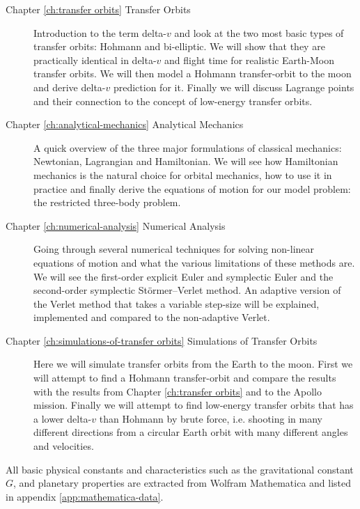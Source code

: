\begin{description}
    \item[Chapter \ref{ch:transfer orbits} Transfer Orbits] Introduction to the term delta-$v$ and look at the two most basic types of transfer orbits: Hohmann and bi-elliptic. We will show that they are practically identical in delta-$v$ and flight time for realistic Earth-Moon transfer orbits. We will then model a Hohmann transfer-orbit to the moon and derive delta-$v$ prediction for it. Finally we will discuss Lagrange points and their connection to the concept of low-energy transfer orbits.
    \item[Chapter \ref{ch:analytical-mechanics} Analytical Mechanics] A quick overview of the three major formulations of classical mechanics: Newtonian, Lagrangian and Hamiltonian. We will see how Hamiltonian mechanics is the natural choice for orbital mechanics, how to use it in practice and finally derive the equations of motion for our model problem: the restricted three-body problem.
    \item[Chapter \ref{ch:numerical-analysis} Numerical Analysis] Going through several numerical techniques for solving non-linear equations of motion and what the various limitations of these methods are. We will see the first-order explicit Euler and symplectic Euler and the second-order symplectic Störmer–Verlet method. An adaptive version of the Verlet method that takes a variable step-size will be explained, implemented and compared to the non-adaptive Verlet.
    \item[Chapter \ref{ch:simulations-of-transfer orbits} Simulations of Transfer Orbits] Here we will simulate transfer orbits from the Earth to the moon. First we will attempt to find a Hohmann transfer-orbit and compare the results with the results from Chapter \ref{ch:transfer orbits} and to the Apollo mission. Finally we will attempt to find low-energy transfer orbits that has a lower delta-$v$ than Hohmann by brute force, i.e. shooting in many different directions from a circular Earth orbit with many different angles and velocities.
\end{description}

All basic physical constants and characteristics such as the gravitational constant $G$, and planetary properties are extracted from Wolfram Mathematica \cite{ma} and listed in appendix \ref{app:mathematica-data}.
